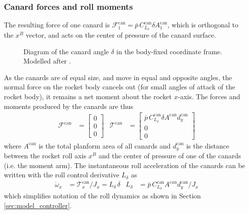 \subsubsection{Canard forces and roll moments}
The resulting force of one canard is $\mathcal{F}^\text{can}_1 = \bar p \, C^\text{can}_{L_\delta} \delta A^\text{can}_1$, which is orthogonal to the $x^B$ vector, and acts on the center of pressure of the canard surface.

\begin{figure}[ht]
    \centering
    \resizebox{0.6\textwidth}{!}{
    }
    \caption[Diagram of the canard angle]{Diagram of the canard angle $\delta$ in the body-fixed coordinate frame. Modelled after \cite{siouris2004}.}
    \label{fig:model_delta}
\end{figure}

As the canards are of equal size, and move in equal and opposite angles, the normal force on the rocket body cancels out (for small angles of attack of the rocket body), it remains a net moment about the rocket $x$-axis.
The forces and moments produced by the canards are thus 
\begin{align}
    \mathcal{F}^\text{can} &= \begin{bmatrix} 0 \\ 0 \\ 0 \end{bmatrix}
    & 
    \mathcal{T}^\text{can} &= \begin{bmatrix} \bar p \, C^\text{can}_{L_\delta} \delta A^\text{can} d^\text{can}_y 
    \\ 0 \\ 0 \end{bmatrix}
\end{align}
where $A^\text{can}$ is the total planform area of all canards and $d^\text{can}_y$ is the distance between the rocket roll axis $x^B$ and the center of pressure of one of the canards (i.e. the moment arm).
The instantaneous roll acceleration of the canards can be written with the roll control derivative $L_\delta$ as 
\begin{align}
    \dot \omega_x &= \mathcal{T}^\text{can}_x / J_x = L_\delta \, \delta
    & 
    L_\delta &= \bar p \, C^\text{can}_{L_\delta} A^\text{can} d^\text{can}_y / J_x
\end{align}
which simplifies notation of the roll dynamics as shown in Section \ref{sec:model_controller}.

